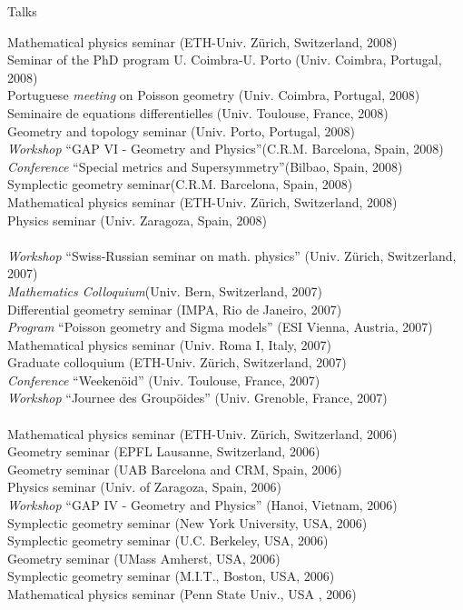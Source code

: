 \documentclass[12p]{resume}
\begin{document}
\begin{category}{Talks}
\begin{tabbing}
Mathematical physics seminar \>(ETH-Univ. Z\"urich, Switzerland, 2008)\\
Seminar of the  PhD program  U. Coimbra-U. Porto  \>(Univ. Coimbra, Portugal, 2008)\\
Portuguese \emph{meeting} on Poisson geometry \>(Univ. Coimbra, Portugal, 2008)\\
Seminaire de equations differentielles \>(Univ. Toulouse, France, 2008)\\
Geometry and topology seminar \>(Univ. Porto, Portugal, 2008)\\
\emph{Workshop} ``GAP VI - Geometry and Physics''\>(C.R.M. Barcelona, Spain, 2008)\\
\emph{Conference} ``Special metrics and Supersymmetry''\>(Bilbao, Spain, 2008)\\
Symplectic geometry seminar\>(C.R.M. Barcelona, Spain, 2008)\\
Mathematical physics seminar \>(ETH-Univ. Z\"urich, Switzerland, 2008)\\
Physics seminar \> (Univ. Zaragoza, Spain, 2008)\\
\> \\

\emph{Workshop} ``Swiss-Russian seminar on math. physics''\> (Univ. Z\"urich, Switzerland, 2007)\\
\emph{Mathematics Colloquium}\>(Univ. Bern, Switzerland, 2007)\\
Differential geometry seminar\> (IMPA, Rio de Janeiro, 2007)\\
\emph{Program} ``Poisson geometry and Sigma models''\> (ESI Vienna, Austria, 2007)\\
Mathematical physics seminar\> (Univ. Roma I, Italy, 2007)\\
Graduate colloquium \>(ETH-Univ.  Z\"urich, Switzerland, 2007)\\
\emph{Conference} ``Weeken\"oid'' \>(Univ. Toulouse, France, 2007)\\
\emph{Workshop} ``Journee des Group\"oides'' \>(Univ. Grenoble, France, 2007)\\
\> \\

 
Mathematical physics seminar \>(ETH-Univ. Z\"urich, Switzerland, 2006)\\
Geometry seminar \>(EPFL Lausanne, Switzerland, 2006)\\
Geometry seminar \>(UAB Barcelona and CRM, Spain, 2006)\\
Physics seminar \>(Univ. of Zaragoza, Spain, 2006)\\
\emph{Workshop} ``GAP IV - Geometry and Physics'' \>(Hanoi, Vietnam,
2006)\\
Symplectic geometry seminar \>(New York University, USA, 2006)\\
Symplectic geometry seminar \>(U.C. Berkeley, USA, 2006)\\
Geometry seminar \>(UMass Amherst, USA, 2006)\\
Symplectic geometry seminar \>(M.I.T., Boston, USA, 2006)\\
Mathematical physics seminar \>(Penn State Univ., USA , 2006)\\
\> \\


\end{tabbing}
\end{category}
\end{document}
